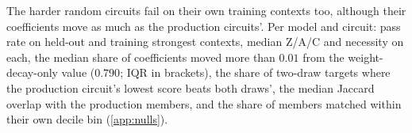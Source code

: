 
\begin{table}[tbp]
\centering
\small
{}
\caption{The harder random circuits fail on their own training contexts too, although their coefficients move as much as the production circuits'.
Per model and circuit: pass rate on held-out and training strongest contexts, median Z/A/C and necessity on each, the median share of coefficients moved more than $0.01$ from the weight-decay-only value ($0.790$; IQR in brackets), the share of two-draw targets where the production circuit's lowest score beats both draws', the median Jaccard overlap with the production members, and the share of members matched within their own decile bin (\cref{app:nulls}).}
\label{tab:run2026-nulls-detail}
\end{table}
